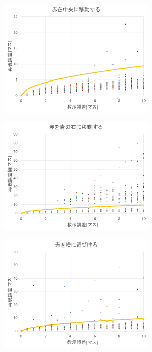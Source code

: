 \begin{figure}[h]
	\centering
	\begin{minipage}[t]{.49\textwidth}
		\centering
		\includegraphics[width=7.5cm]{スライド2.PNG} \\ %
		\label{subfig:unit_a}    
	\end{minipage}
	\begin{minipage}[t]{.49\textwidth}
		\centering
		\includegraphics[width=7.5cm]{スライド3.PNG} \\ %
		\label{subfig:unit_b}
	\end{minipage}
	\begin{minipage}[t]{.49\textwidth}
		\centering
		\includegraphics[width=7.5cm]{スライド4.PNG} \\ %

\end{minipage}
\end{figure}
